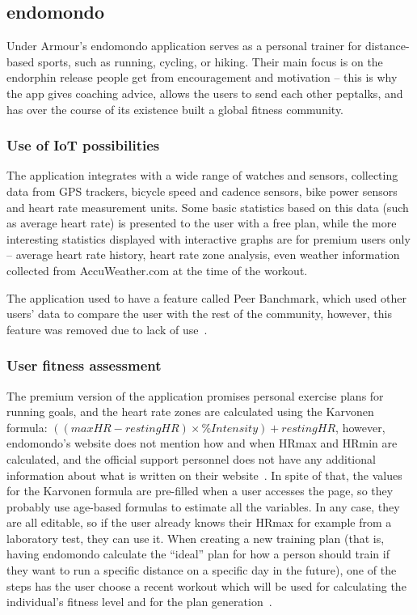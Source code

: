 \pagebreak
\subsection{endomondo}

Under Armour's endomondo application serves as a personal trainer for distance-based sports, such as running, cycling, or hiking.
Their main focus is on the endorphin release people get from encouragement and motivation -- this is why the app gives coaching advice, allows the users to send each other peptalks, and has over the course of its existence built a global fitness community.
\subsubsection*{Use of IoT possibilities}
The application integrates with a wide range of watches and sensors, collecting data from GPS trackers, bicycle speed and cadence sensors, bike power sensors and heart rate measurement units.
Some basic statistics based on this data (such as average heart rate) is presented to the user with a free plan, 
while the more interesting statistics displayed with interactive graphs are for premium users only -- average heart rate history, heart rate zone analysis, even weather information collected from AccuWeather.com at the time of the workout.

The application used to have a feature called Peer Banchmark, which used other users' data to compare the user with the rest of the community, however, this feature was removed due to lack of use~\cite{endomondo-HR-max-emails}.
\subsubsection*{User fitness assessment}
The premium version of the application promises personal exercise plans for running goals, and the heart rate zones are calculated using the Karvonen formula: $((max HR − resting HR) × \% Intensity) + resting HR$,
however, endomondo's website does not mention how and when HRmax and HRmin are calculated, and the official support personnel does not have any additional information about what is written on their website~\cite{endomondo-HR-max-emails}.
In spite of that, the values for the Karvonen formula are pre-filled when a user accesses the page, so they probably use age-based formulas to estimate all the variables.
In any case, they are all editable, so if the user already knows their HRmax for example from a laboratory test, they can use it.
When creating a new training plan (that is, having endomondo calculate the ``ideal'' plan for how a person should train if they want to run a specific distance on a specific day in the future),
one of the steps has the user choose a recent workout which will be used for calculating the individual's fitness level and for the plan generation~\cite{endomondo-training-plan-fitness-assessment}.
